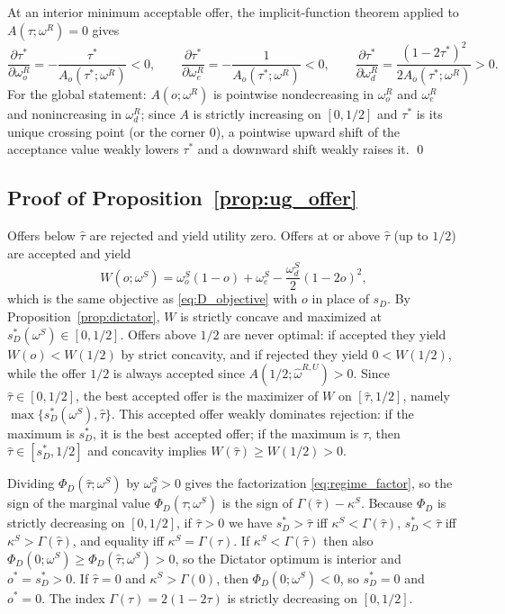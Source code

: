 \documentclass[11pt]{article}
\theoremstyle{plain}
\theoremstyle{remark}
\begin{document}
At an interior minimum acceptable offer, the implicit-function theorem applied to $A(\tau;\omega^R)=0$ gives
\[
        \frac{\partial \tau^\ast}{\partial \omega_o^R}
        =
        -\frac{\tau^\ast}{A_o(\tau^\ast;\omega^R)}<0,
        \qquad
        \frac{\partial \tau^\ast}{\partial \omega_e^R}
        =
        -\frac{1}{A_o(\tau^\ast;\omega^R)}<0,
        \qquad
        \frac{\partial \tau^\ast}{\partial \omega_d^R}
        =
        \frac{(1-2\tau^\ast)^2}{2A_o(\tau^\ast;\omega^R)}>0.
\]
For the global statement: $A(o;\omega^R)$ is pointwise nondecreasing in $\omega_o^R$ and $\omega_e^R$ and nonincreasing in $\omega_d^R$; since $A$ is strictly increasing on $[0,1/2]$ and $\tau^\ast$ is its unique crossing point (or the corner $0$), a pointwise upward shift of the acceptance value weakly lowers $\tau^\ast$ and a downward shift weakly raises it.
\qed

\subsection*{Proof of Proposition~\ref{prop:ug_offer}}

Offers below $\hat\tau$ are rejected and yield utility zero.  Offers at or above $\hat\tau$ (up to $1/2$) are accepted and yield
\[
        W(o;\omega^S)
        =
        \omega_o^S(1-o)
        +\omega_e^S
        -\frac{\omega_d^S}{2}(1-2o)^2,
\]
which is the same objective as \eqref{eq:D_objective} with $o$ in place of $s_D$.  By Proposition~\ref{prop:dictator}, $W$ is strictly concave and maximized at $s_D^\ast(\omega^S)\in[0,1/2]$.  Offers above $1/2$ are never optimal: if accepted they yield $W(o)<W(1/2)$ by strict concavity, and if rejected they yield $0<W(1/2)$, while the offer $1/2$ is always accepted since $A(1/2;\hat\omega^{R,U})>0$.  Since $\hat\tau\in[0,1/2]$, the best accepted offer is the maximizer of $W$ on $[\hat\tau,1/2]$, namely $\max\{s_D^\ast(\omega^S),\hat\tau\}$.  This accepted offer weakly dominates rejection: if the maximum is $s_D^\ast$, it is the best accepted offer; if the maximum is $\hat\tau$, then $\hat\tau\in[s_D^\ast,1/2]$ and concavity implies $W(\hat\tau)\ge W(1/2)>0$.

Dividing $\Phi_D(\hat\tau;\omega^S)$ by $\omega_d^S>0$ gives the factorization \eqref{eq:regime_factor}, so the sign of the marginal value $\Phi_D(\hat\tau;\omega^S)$ is the sign of $\Gamma(\hat\tau)-\kappa^S$.  Because $\Phi_D$ is strictly decreasing on $[0,1/2]$, if $\hat\tau>0$ we have $s_D^\ast>\hat\tau$ iff $\kappa^S<\Gamma(\hat\tau)$, $s_D^\ast<\hat\tau$ iff $\kappa^S>\Gamma(\hat\tau)$, and equality iff $\kappa^S=\Gamma(\hat\tau)$.  If $\kappa^S<\Gamma(\hat\tau)$ then also $\Phi_D(0;\omega^S)\ge\Phi_D(\hat\tau;\omega^S)>0$, so the Dictator optimum is interior and $o^\ast=s_D^\ast>0$.  If $\hat\tau=0$ and $\kappa^S>\Gamma(0)$, then $\Phi_D(0;\omega^S)<0$, so $s_D^\ast=0$ and $o^\ast=0$.  The index $\Gamma(\tau)=2(1-2\tau)$ is strictly decreasing on $[0,1/2]$.
\end{document}
